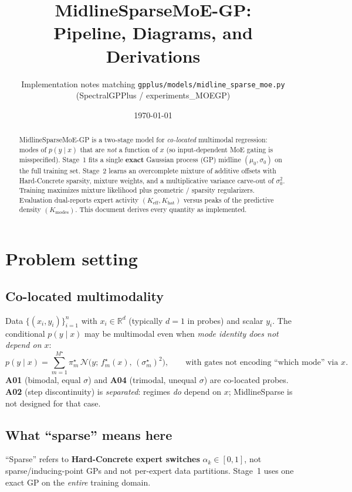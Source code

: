 \documentclass[11pt,a4paper]{article}
\title{\textbf{MidlineSparseMoE-GP}:\\
Pipeline, Diagrams, and Derivations}
\author{Implementation notes matching \texttt{gpplus/models/midline\_sparse\_moe.py}\\
(SpectralGPPlus / experiments\_MOEGP)}
\date{\today}
\newcommand{\R}{\mathbb{R}}
\newcommand{\Ncal}{\mathcal{N}}
\newcommand{\Keff}{K_{\mathrm{eff}}}
\newcommand{\Khat}{K_{\mathrm{hat}}}
\newcommand{\Kmodes}{K_{\mathrm{modes}}}
\begin{document}
\maketitle

\begin{abstract}
MidlineSparseMoE-GP is a two-stage model for \emph{co-located} multimodal regression:
modes of \(p(y\mid x)\) that are \emph{not} a function of \(x\) (so input-dependent
MoE gating is misspecified). Stage~1 fits a single \textbf{exact} Gaussian process (GP)
midline \((\mu_0,\sigma_0)\) on the full training set. Stage~2 learns an overcomplete
mixture of additive offsets with Hard-Concrete sparsity, mixture weights, and a
multiplicative variance carve-out of \(\sigma_0^2\). Training maximizes mixture
likelihood plus geometric / sparsity regularizers. Evaluation dual-reports expert
activity \((\Keff,\Khat)\) versus peaks of the predictive density \((\Kmodes)\).
This document derives every quantity as implemented.
\end{abstract}

\tableofcontents
\newpage

\section{Problem setting}

\subsection{Co-located multimodality}
Data \(\{(x_i,y_i)\}_{i=1}^n\) with \(x_i\in\R^{d}\) (typically \(d{=}1\) in probes)
and scalar \(y_i\). The conditional \(p(y\mid x)\) may be multimodal even when
\emph{mode identity does not depend on \(x\)}:
\begin{equation}
  p(y\mid x)
  =
  \sum_{m=1}^{M^\star}
  \pi_m^\star\,
  \Ncal\!\bigl(y;\, f_m^\star(x),\, (\sigma_m^\star)^2\bigr),
  \qquad
  \text{with gates not encoding ``which mode'' via \(x\).}
\end{equation}
\textbf{A01} (bimodal, equal \(\sigma\)) and \textbf{A04} (trimodal, unequal \(\sigma\))
are co-located probes. \textbf{A02} (step discontinuity) is \emph{separated}:
regimes \emph{do} depend on \(x\); MidlineSparse is not designed for that case.

\subsection{What ``sparse'' means here}
``Sparse'' refers to \textbf{Hard-Concrete expert switches} \(\alpha_k\in[0,1]\),
not sparse/inducing-point GPs and not per-expert data partitions.
Stage~1 uses one exact GP on the \emph{entire} training domain.
\end{document}

